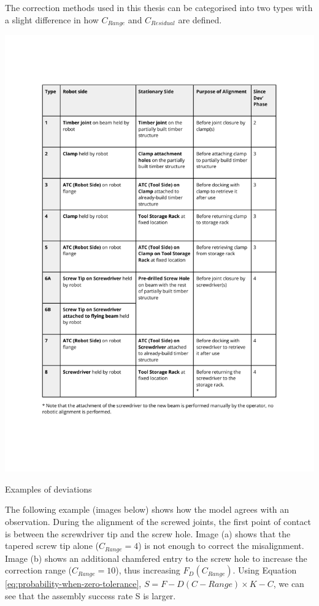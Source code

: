 The correction methods used in this thesis can be categorised into two types with a slight difference in how $C_{Range}$ and $C_{Residual}$ are defined.

\begin{table}
    \includegraphics[page=6, trim=25.4mm 160mm 25.4mm 33mm, clip, width=\textwidth]{tables/Tables in Chapter 9 to 11.pdf}
    \caption{Examples of deviations}
\end{table}

The following example (images below) shows how the model agrees with an observation. During the alignment of the screwed joints, the first point of contact is between the screwdriver tip and the screw hole. Image (a) shows that the tapered screw tip alone ($C_{Range} = 4$) is not enough to correct the misalignment. Image (b) shows an additional chamfered entry to the screw hole to increase the correction range ($C_{Range} = 10$), thus increasing $F_D(C_{Range})$. Using Equation \ref{eq:probability-when-zero-tolerance}, $S = F-{D}(C-{Range}) \times K-{C}$, we can see that the assembly success rate S is larger. 

